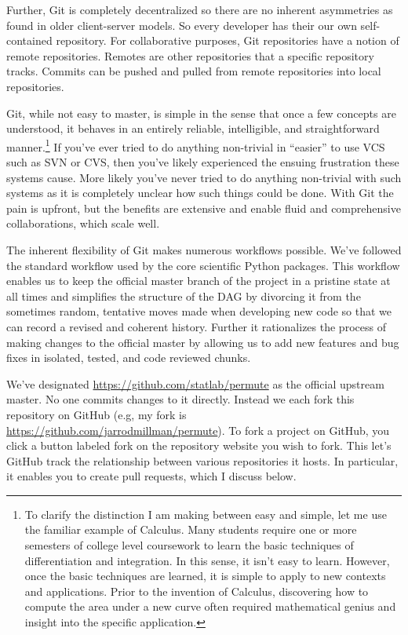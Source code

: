 Further, Git is completely decentralized so there are no inherent
asymmetries as found in older client-server models.  So every developer
has their our own self-contained repository.  For collaborative purposes,
Git repositories have a notion of remote repositories.  Remotes are other
repositories that a specific repository tracks.  Commits can be pushed
and pulled from remote repositories into local repositories.

Git, while not easy to master, is simple in the sense that once a few concepts
are understood, it behaves in an entirely reliable, intelligible, and
straightforward manner.\footnote{To clarify the distinction I am making between
easy and simple, let me use the familiar example of Calculus.  Many students
require one or more semesters of college level coursework to learn the basic
techniques of differentiation and integration.  In this sense, it isn't easy to
learn.  However, once the basic techniques are learned, it is simple to apply
to new contexts and applications.  Prior to the invention of Calculus,
discovering how to compute the area under a new curve often required
mathematical genius and insight into the specific application.} If you've ever
tried to do anything non-trivial in ``easier'' to use VCS such as SVN or CVS,
then you've likely experienced the ensuing frustration these systems cause.
More likely you've never tried to do anything non-trivial with such systems as
it is completely unclear how such things could be done.  With Git the pain is
upfront, but the benefits are extensive and enable fluid and comprehensive
collaborations, which scale well.

The inherent flexibility of Git makes numerous workflows possible.  We've
followed the standard workflow used by the core scientific Python packages.
This workflow enables us to keep the official master branch of the project in a
pristine state at all times and simplifies the structure of the DAG by
divorcing it from the sometimes random, tentative moves made when developing
new code so that we can record a revised and coherent history.  Further it
rationalizes the process of making changes to the official master by allowing
us to add new features and bug fixes in isolated, tested, and code reviewed
chunks.

We've designated \url{https://github.com/statlab/permute} as the official
upstream master.  No one commits changes to it directly.  Instead we each fork
this repository on GitHub (e.g, my fork is
\url{https://github.com/jarrodmillman/permute}).  To fork a project on GitHub,
you click a button labeled fork on the repository website you wish to fork.
This let's GitHub track the relationship between various repositories it hosts.
In particular, it enables you to create pull requests, which I discuss below.

